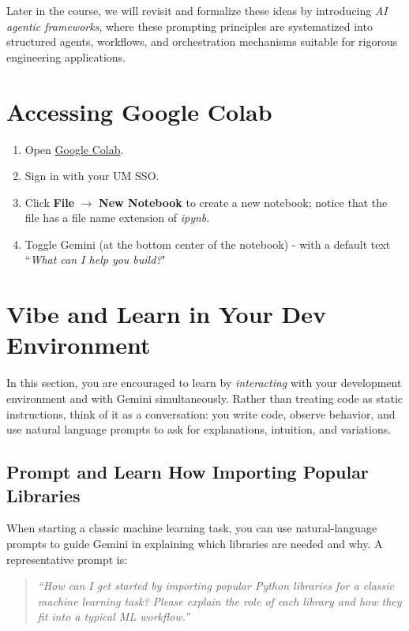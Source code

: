 \documentclass[12pt]{article}
\begin{document}
Later in the course, we will revisit and formalize these ideas by introducing \emph{AI agentic frameworks}, where these prompting principles are systematized into structured agents, workflows, and orchestration mechanisms suitable for rigorous engineering applications.



\section*{Accessing Google Colab}
\begin{enumerate}
    \item Open \href{https://colab.research.google.com}{Google Colab}.
    \item Sign in with your UM SSO.
    \item Click \textbf{File} $\to$ \textbf{New Notebook} to create a new notebook; notice that the file has a file name extension of \textit{ipynb}.
    \item Toggle Gemini (at the bottom center of the notebook) - with a default text ``\textit{What can I help you build?}"
\end{enumerate}

\section*{Vibe and Learn in Your Dev Environment}

In this section, you are encouraged to learn by \emph{interacting} with your development environment and with Gemini simultaneously. Rather than treating code as static instructions, think of it as a conversation: you write code, observe behavior, and use natural language prompts to ask for explanations, intuition, and variations.



\subsection*{Prompt and Learn How Importing Popular Libraries}

When starting a classic machine learning task, you can use natural-language prompts to guide Gemini in explaining which libraries are needed and why.  
A representative prompt is:

\begin{quote}
\emph{``How can I get started by importing popular Python libraries for a classic machine learning task? Please explain the role of each library and how they fit into a typical ML workflow.''}
\end{quote}
\end{document}
